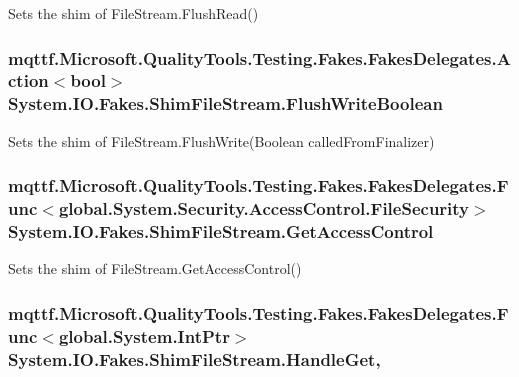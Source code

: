 Sets the shim of File\-Stream.\-Flush\-Read()

\hypertarget{class_system_1_1_i_o_1_1_fakes_1_1_shim_file_stream_a98e23ef4fc9c7cea5aa6d71c7ac5d1d2}{
\subsubsection[{Flush\-Write\-Boolean}]{\setlength{\rightskip}{0pt plus 5cm}mqttf.\-Microsoft.\-Quality\-Tools.\-Testing.\-Fakes.\-Fakes\-Delegates.\-Action$<$bool$>$ System.\-I\-O.\-Fakes.\-Shim\-File\-Stream.\-Flush\-Write\-Boolean\hspace{0.3cm}{\ttfamily [set]}}}\label{class_system_1_1_i_o_1_1_fakes_1_1_shim_file_stream_a98e23ef4fc9c7cea5aa6d71c7ac5d1d2}


Sets the shim of File\-Stream.\-Flush\-Write(\-Boolean called\-From\-Finalizer)

\hypertarget{class_system_1_1_i_o_1_1_fakes_1_1_shim_file_stream_a82082f6a27aa23790709a8d9a552fe04}{
\subsubsection[{Get\-Access\-Control}]{\setlength{\rightskip}{0pt plus 5cm}mqttf.\-Microsoft.\-Quality\-Tools.\-Testing.\-Fakes.\-Fakes\-Delegates.\-Func$<$global.\-System.\-Security.\-Access\-Control.\-File\-Security$>$ System.\-I\-O.\-Fakes.\-Shim\-File\-Stream.\-Get\-Access\-Control\hspace{0.3cm}{\ttfamily [set]}}}\label{class_system_1_1_i_o_1_1_fakes_1_1_shim_file_stream_a82082f6a27aa23790709a8d9a552fe04}


Sets the shim of File\-Stream.\-Get\-Access\-Control()

\hypertarget{class_system_1_1_i_o_1_1_fakes_1_1_shim_file_stream_a28450ee11e491e9aee35a711f81306e2}{
\subsubsection[{Handle\-Get}]{\setlength{\rightskip}{0pt plus 5cm}mqttf.\-Microsoft.\-Quality\-Tools.\-Testing.\-Fakes.\-Fakes\-Delegates.\-Func$<$global.\-System.\-Int\-Ptr$>$ System.\-I\-O.\-Fakes.\-Shim\-File\-Stream.\-Handle\-Get\hspace{0.3cm}{\ttfamily [get]}, {\ttfamily [set]}}}\label{class_system_1_1_i_o_1_1_fakes_1_1_shim_file_stream_a28450ee11e491e9aee35a711f81306e2}


